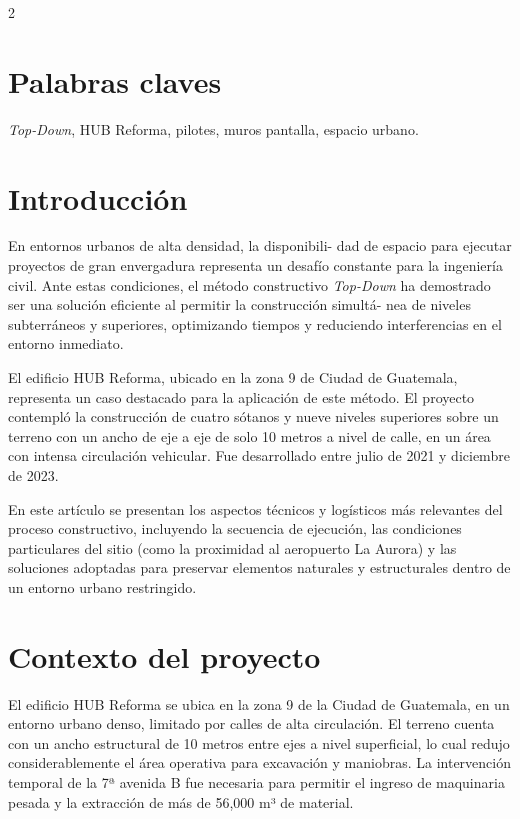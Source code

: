 \documentclass[12pt,spanish,Letterpaper,openany]{book}
\begin{document}
\begin {multicols}{2}
\hypertarget{palabras-claves-1}{%
\section{Palabras claves}\label{palabras-claves-1}}

\emph{Top-Down}, HUB Reforma, pilotes, muros pantalla, espacio urbano.

\hypertarget{introducciuxf3n-1}{%
\section{Introducción}\label{introducciuxf3n-1}}

En entornos urbanos de alta densidad, la disponibili-
dad de espacio para ejecutar proyectos de gran envergadura representa un desafío constante para la ingeniería civil. Ante estas condiciones, el método constructivo \emph{Top-Down} ha demostrado ser una solución eficiente al permitir la construcción simultá-
nea de niveles subterráneos y superiores, optimizando tiempos y reduciendo interferencias en el entorno inmediato.

El edificio HUB Reforma, ubicado en la zona 9 de Ciudad de Guatemala, representa un caso destacado para la aplicación de este método. El proyecto contempló la construcción de cuatro sótanos y nueve niveles superiores sobre un terreno con un ancho de eje a eje de solo 10 metros a nivel de calle, en un área con intensa circulación vehicular. Fue desarrollado entre julio de 2021 y diciembre de 2023.

En este artículo se presentan los aspectos técnicos y logísticos más relevantes del proceso constructivo, incluyendo la secuencia de ejecución, las condiciones particulares del sitio (como la proximidad al aeropuerto La Aurora) y las soluciones adoptadas para preservar elementos naturales y estructurales dentro de un entorno urbano restringido.

\hypertarget{contexto-del-proyecto}{%
\section{Contexto del proyecto}\label{contexto-del-proyecto}}

El edificio HUB Reforma se ubica en la zona 9 de la Ciudad de Guatemala, en un entorno urbano denso, limitado por calles de alta circulación. El terreno cuenta con un ancho estructural de 10 metros entre ejes a nivel superficial, lo cual redujo considerablemente el área operativa para excavación y maniobras. La intervención temporal de la 7ª avenida B fue necesaria para permitir el ingreso de maquinaria pesada y la extracción de más de 56,000 m³ de material.


\end{multicols}
\end{document}
